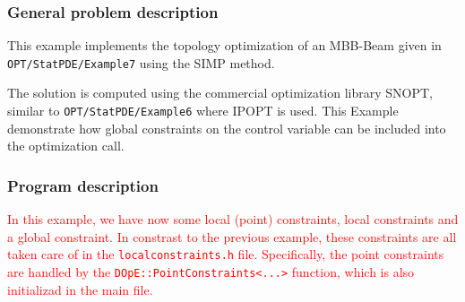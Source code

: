 \subsubsection{General problem description}
This example implements the topology optimization of an MBB-Beam given in \\
{\tt OPT/StatPDE/Example7} using the SIMP method.

The solution is computed using the commercial optimization library SNOPT, similar 
to {\tt OPT/StatPDE/Example6} where IPOPT is used. 
This Example demonstrate how global constraints on
the control variable can be included into the optimization call.

\subsubsection{Program description}
\textcolor{red}{
In this example, we have now some local (point) constraints, local constraints and a global
constraint. In constrast to the previous example, these 
constraints are all taken care of in the 
\texttt{localconstraints.h} file. 
Specifically, the point constraints are handled by the 
\texttt{DOpE::PointConstraints<...>} function, which is also initializad 
in the main file. 
}

